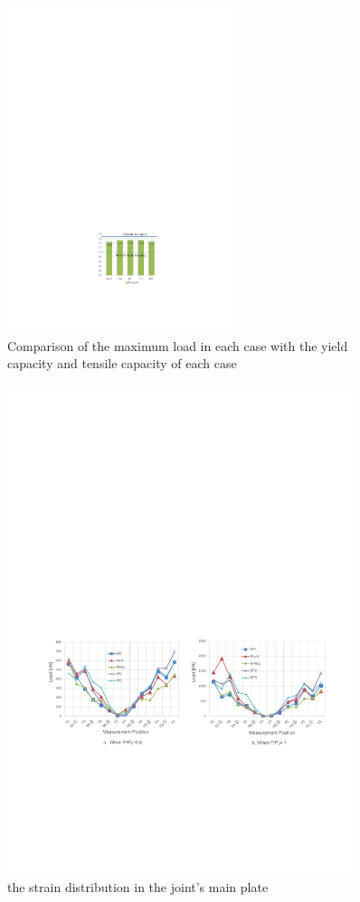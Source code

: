\begin{figure}[htbp]
    \centering
    \includegraphics[width=0.6\textwidth]{imgs/ch3/fig3-23.pdf}
    \caption{Comparison of the maximum load in each case with the yield capacity and tensile capacity of each case}
    \label{fig3-23}
\end{figure}

\begin{figure}[htbp]
    \centering
    \includegraphics[width=0.9\textwidth]{imgs/ch3/fig3-24.pdf}
    \caption{the strain distribution in the joint's main plate}
    \label{fig3-24}
\end{figure}


